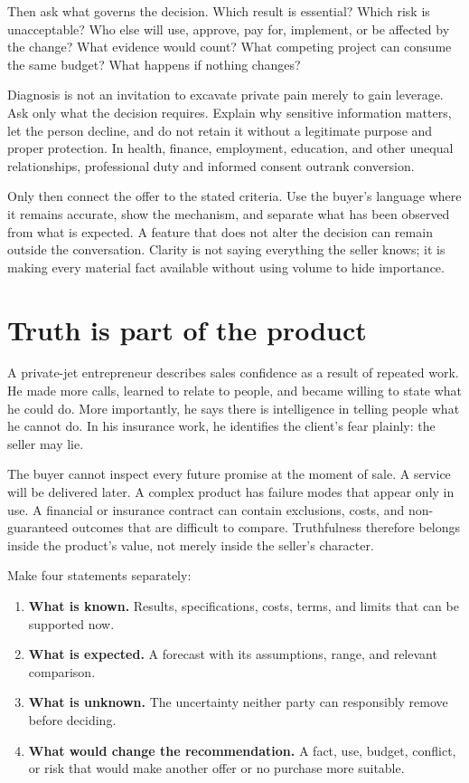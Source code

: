 Then ask what governs the decision. Which result is essential? Which risk is
unacceptable? Who else will use, approve, pay for, implement, or be affected by
the change? What evidence would count? What competing project can consume the
same budget? What happens if nothing changes?

Diagnosis is not an invitation to excavate private pain merely to gain
leverage. Ask only what the decision requires. Explain why sensitive
information matters, let the person decline, and do not retain it without a
legitimate purpose and proper protection. In health, finance, employment,
education, and other unequal relationships, professional duty and informed
consent outrank conversion.

Only then connect the offer to the stated criteria. Use the buyer's language
where it remains accurate, show the mechanism, and separate what has been
observed from what is expected. A feature that does not alter the decision can
remain outside the conversation. Clarity is not saying everything the seller
knows; it is making every material fact available without using volume to hide
importance.

\section{Truth is part of the product}

A private-jet entrepreneur describes sales confidence as a result of repeated
work. He made more calls, learned to relate to people, and became willing to
state what he could do. More importantly, he says there is intelligence in
telling people what he cannot do. In his insurance work, he identifies the
client's fear plainly: the seller may lie.

The buyer cannot inspect every future promise at the moment of sale. A service
will be delivered later. A complex product has failure modes that appear only
in use. A financial or insurance contract can contain exclusions, costs, and
non-guaranteed outcomes that are difficult to compare. Truthfulness therefore
belongs inside the product's value, not merely inside the seller's character.

Make four statements separately:

\begin{enumerate}[itemsep=0.15em]
\item \textbf{What is known.} Results, specifications, costs, terms, and limits
  that can be supported now.
\item \textbf{What is expected.} A forecast with its assumptions, range, and
  relevant comparison.
\item \textbf{What is unknown.} The uncertainty neither party can responsibly
  remove before deciding.
\item \textbf{What would change the recommendation.} A fact, use, budget,
  conflict, or risk that would make another offer or no purchase more suitable.
\end{enumerate}

